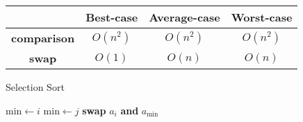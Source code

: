 \documentclass{article}
\begin{document}
\def\arraystretch{1.5}
\begin{center}
	\begin{tabular}{ |c|c|c|c| }
		\hline
		& \textbf{Best-case} & \textbf{Average-case} &\textbf{Worst-case} \\
		\hline
		\textbf{comparison} & \(O(n^2)\) & \(O(n^2)\) & \(O(n^2)\) \\ 
		\hline
		\textbf{swap} & \(O(1)\) & \(O(n)\) & \(O(n)\) \\ 
		\hline
	\end{tabular}
\end{center}

\begin{algorithm}
	\begin{algorithmic}
		\caption{Selection Sort}
			\State \(\text{min}\gets i\)
					\State \(\text{min}\gets j\)
				\EndIf
			\EndFor
			\State \textbf{swap} \(a_i\) \textbf{and} \(a_{\text{min}}\)
		\EndFor
	\end{algorithmic}
\end{algorithm}
\end{document}
